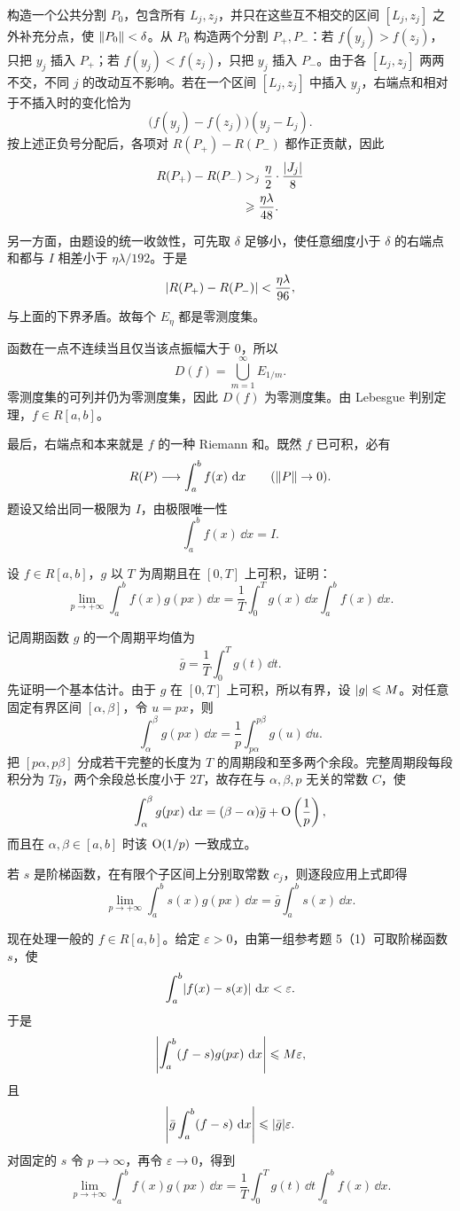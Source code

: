 \begin{xsolution}
构造一个公共分割 $P_0$，包含所有 $L_j,z_j$，并只在这些互不相交的区间 $[L_j,z_j]$ 之外补充分点，使 $\norm{P_0}<\delta$。从 $P_0$ 构造两个分割 $P_+,P_-$：若 $f(y_j)>f(z_j)$，只把 $y_j$ 插入 $P_+$；若 $f(y_j)<f(z_j)$，只把 $y_j$ 插入 $P_-$。由于各 $[L_j,z_j]$ 两两不交，不同 $j$ 的改动互不影响。若在一个区间 $[L_j,z_j]$ 中插入 $y_j$，右端点和相对于不插入时的变化恰为
\[
  \bigl(f(y_j)-f(z_j)\bigr)(y_j-L_j).
\]
按上述正负号分配后，各项对 $R(P_+)-R(P_-)$ 都作正贡献，因此
\begin{align*}
  R(P_+)-R(P_-)
  &>\sum_j\frac\eta2\cdot\frac{\abs{J_j}}8\\
  &\geqslant\frac{\eta\lambda}{48}.
\end{align*}

另一方面，由题设的统一收敛性，可先取 $\delta$ 足够小，使任意细度小于 $\delta$ 的右端点和都与 $I$ 相差小于 $\eta\lambda/192$。于是
\[
  \abs{R(P_+)-R(P_-)}<\frac{\eta\lambda}{96},
\]
与上面的下界矛盾。故每个 $E_\eta$ 都是零测度集。

函数在一点不连续当且仅当该点振幅大于 $0$，所以
\[
  D(f)=\bigcup_{m=1}^\infty E_{1/m}.
\]
零测度集的可列并仍为零测度集，因此 $D(f)$ 为零测度集。由 Lebesgue 判别定理，$f\in R[a,b]$。

最后，右端点和本来就是 $f$ 的一种 Riemann 和。既然 $f$ 已可积，必有
\[
  R(P)\longrightarrow\int_a^b f(x)\,\dd x
  \qquad(\norm P\to0).
\]
题设又给出同一极限为 $I$，由极限唯一性
\[
  \boxed{\int_a^b f(x)\,\dd x=I}.
\]
\end{xsolution}


\begin{xreferenceproblem}[4（Riemann 定理）]
设 $f\in R[a,b]$，$g$ 以 $T$ 为周期且在 $[0,T]$ 上可积，证明：
\[
  \lim_{p\to+\infty}\int_a^b f(x)g(px)\,\dd x
  =\frac1T\int_0^T g(x)\,\dd x\int_a^b f(x)\,\dd x.
\]
\end{xreferenceproblem}
\begin{xsolution}
记周期函数 $g$ 的一个周期平均值为
\[
  \bar g=\frac1T\int_0^Tg(t)\,\dd t.
\]
先证明一个基本估计。由于 $g$ 在 $[0,T]$ 上可积，所以有界，设 $\abs g\leqslant M$。对任意固定有界区间 $[\alpha,\beta]$，令 $u=px$，则
\[
  \int_\alpha^\beta g(px)\,\dd x
  =\frac1p\int_{p\alpha}^{p\beta}g(u)\,\dd u.
\]
把 $[p\alpha,p\beta]$ 分成若干完整的长度为 $T$ 的周期段和至多两个余段。完整周期段每段积分为 $T\bar g$，两个余段总长度小于 $2T$，故存在与 $\alpha,\beta,p$ 无关的常数 $C$，使
\[
  \int_\alpha^\beta g(px)\,\dd x
  =(\beta-\alpha)\bar g+\bigO\left(\frac1p\right),
\]
而且在 $\alpha,\beta\in[a,b]$ 时该 $\bigO(1/p)$ 一致成立。

若 $s$ 是阶梯函数，在有限个子区间上分别取常数 $c_j$，则逐段应用上式即得
\[
  \lim_{p\to+\infty}\int_a^b s(x)g(px)\,\dd x
  =\bar g\int_a^b s(x)\,\dd x.
\]

现在处理一般的 $f\in R[a,b]$。给定 $\varepsilon>0$，由第一组参考题 5（1）可取阶梯函数 $s$，使
\[
  \int_a^b\abs{f(x)-s(x)}\,\dd x<\varepsilon.
\]
于是
\[
  \abs*{\int_a^b(f-s)g(px)\,\dd x}
  \leqslant M\varepsilon,
\]
且
\[
  \abs*{\bar g\int_a^b(f-s)\,\dd x}
  \leqslant\abs{\bar g}\varepsilon.
\]
对固定的 $s$ 令 $p\to\infty$，再令 $\varepsilon\to0$，得到
\[
  \boxed{
  \lim_{p\to+\infty}\int_a^b f(x)g(px)\,\dd x
  =\frac1T\int_0^Tg(t)\,\dd t\int_a^b f(x)\,\dd x}.
\]
\end{xsolution}


